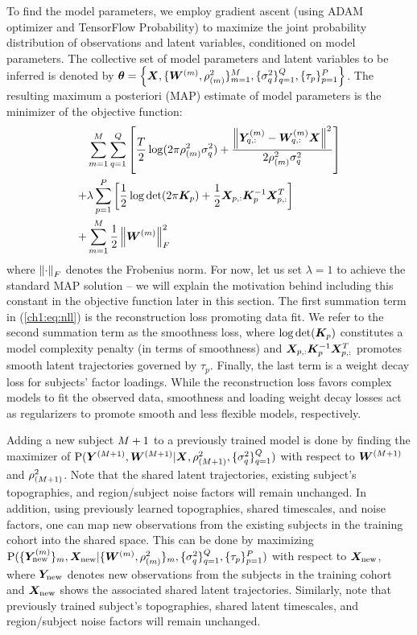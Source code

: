 To find the model parameters, we employ gradient ascent (using ADAM optimizer \cite{adam} and TensorFlow Probability) to maximize the joint probability distribution of observations and latent variables, conditioned on model parameters. The collective set of model parameters and latent variables to be inferred is denoted by $\bm{\theta}=\left\{ \bm{X}, \{\bm{W}^{(m)}, \rho_{(m)}^2\}_{m=1}^M, \{\sigma_{q}^2\}_{q=1}^Q, \{\tau_p\}_{p=1}^P \right\}$. The resulting maximum a posteriori (MAP) estimate of model parameters is the minimizer of the objective function:
\begin{align}
    & \sum_{m=1}^{M} \sum_{q=1}^{Q} \left[ \frac{T}{2} \log(2\pi\rho_{(m)}^2\sigma_{q}^2) + \frac{\left\lVert \bm{Y}^{(m)}_{q,:} - \bm{W}^{(m)}_{q,:} \bm{X} \right\rVert^2}{2\rho_{(m)}^2\sigma_{q}^2} \right]  \nonumber \\
    + & \lambda \sum_{p=1}^{P} \left[ \frac{1}{2}\log\det(2\pi \bm{K}_{p}) + \frac{1}{2}\bm{X}_{p,:} \bm{K}_{p}^{-1} \bm{X}_{p,:}^T \right] \nonumber \\
    + & \sum_{m=1}^{M} \frac{1}{2} \left\lVert\bm{W}^{(m)}\right\rVert_F^2 
    \label{ch1:eq:nll}
\end{align}
where $\left\lVert\cdot\right\rVert_F$ denotes the Frobenius norm. For now, let us set $\lambda=1$ to achieve the standard MAP solution -- we will explain the motivation behind including this constant in the objective function later in this section. The first summation term in (\ref{ch1:eq:nll}) is the reconstruction loss promoting data fit. We refer to the second summation term as the smoothness loss, where $\log\det(\bm{K}_p)$ constitutes a model complexity penalty (in terms of smoothness) and $\bm{X}_{p,:} \bm{K}_{p}^{-1} \bm{X}_{p,:}^T$ promotes smooth latent trajectories governed by $\tau_p$. Finally, the last term is a weight decay loss for subjects' factor loadings. While the reconstruction loss favors complex models to fit the observed data, smoothness and loading weight decay losses act as regularizers to promote smooth and less flexible models, respectively.

Adding a new subject $M+1$ to a previously trained model is done by finding the maximizer of $\text{P}(\bm{Y}^{(M+1)}, \bm{W}^{(M+1)} | \bm{X}, \rho_{(M+1)}^2,  \{\sigma_{q}^2\}_{q=1}^Q)$ with respect to $\bm{W}^{(M+1)}$ and $\rho_{(M+1)}^2$. Note that the shared latent trajectories, existing subject's topographies, and region/subject noise factors will remain unchanged.
In addition, using previously learned topographies, shared timescales, and noise factors, one can map new observations from the existing subjects in the training cohort into the shared space. This can be done by maximizing 
$\text{P}(\{\bm{Y}_{\text{new}}^{(m)}\}_{m}, \bm{X}_{\text{new}} | \{\bm{W}^{(m)}, \rho_{(m)}^2\}_{m}, \{\sigma_{q}^2\}_{q=1}^Q, \{\tau_p\}_{p=1}^P)$
with respect to $\bm{X}_{\text{new}}$, where $\bm{Y}_{\text{new}}$ denotes new observations from the subjects in the training cohort and $\bm{X}_{\text{new}}$ shows the associated shared latent trajectories. Similarly, note that previously trained subject's topographies, shared latent timescales, and region/subject noise factors will remain unchanged.

